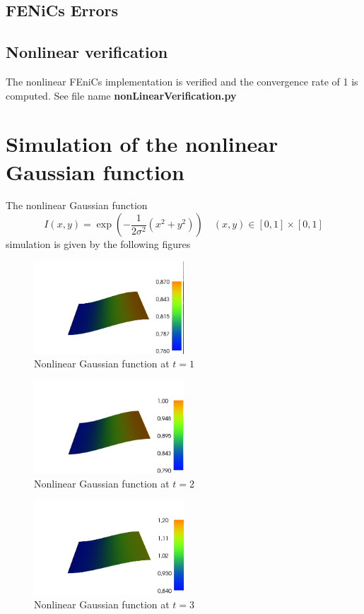 \documentclass[10pt,a4paper]{report}
\begin{document}
\subsection{FENiCs Errors}



\subsection{Nonlinear verification}
The nonlinear FEniCs implementation is verified and the convergence rate of 1 is computed. See file name 
\textbf{nonLinearVerification.py}

\section{Simulation of the nonlinear Gaussian function}
The nonlinear Gaussian function 
\begin{equation}
I(x,y) = \exp\left(  -\frac{1}{2\sigma^{2}}(x^{2}+y^{2})  \right) \quad (x,y)\in [0,1]\times[0,1]
\end{equation}
simulation is given by the following figures

\begin{figure}[H]
  \caption{Nonlinear Gaussian function at $t=1$}
  \centering
    \includegraphics[width=0.5\textwidth]{g1.png}
\end{figure}

\begin{figure}[H]
  \caption{Nonlinear Gaussian function at $t=2$}
  \centering
    \includegraphics[width=0.5\textwidth]{g2.png}
\end{figure}

\begin{figure}[H]
  \caption{Nonlinear Gaussian function at $t=3$}
  \centering
    \includegraphics[width=0.5\textwidth]{g3.png}
\end{figure}
\end{document}
